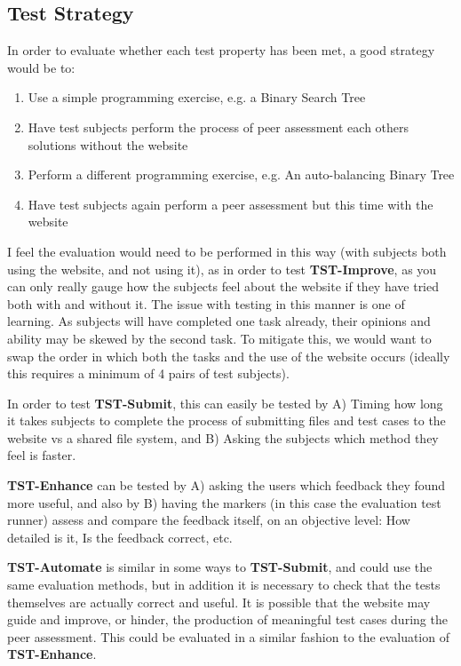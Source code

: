 \documentclass[a4paper,11pt]{report}
\begin{document}
\subsection{Test Strategy}
In order to evaluate whether each test property has been met, a good strategy would be to:
\begin{enumerate}
 \item Use a simple programming exercise, e.g. a Binary Search Tree
 \item Have test subjects perform the process of peer assessment each others solutions without the website
 \item Perform a different programming exercise, e.g. An auto-balancing Binary Tree
 \item Have test subjects again perform a peer assessment but this time with the website
\end{enumerate}
I feel the evaluation would need to be performed in this way (with subjects both using the website, and not using it), as in order to test \textbf{TST-Improve}, as you can only really gauge how the subjects feel about the website if they have tried both with and without it. The issue with testing in this manner is one of learning. As subjects will have completed one task already, their opinions and ability may be skewed by the second task. To mitigate this, we would want to swap the order in which both the tasks and the use of the website occurs (ideally this requires a minimum of 4 pairs of test subjects).\par
In order to test \textbf{TST-Submit}, this can easily be tested by A) Timing how long it takes subjects to complete the process of submitting files and test cases to the website vs a shared file system, and B) Asking the subjects which method they feel is faster.\par
\textbf{TST-Enhance} can be tested by A) asking the users which feedback they found more useful, and also by B) having the markers (in this case the evaluation test runner) assess and compare the feedback itself, on an objective level: How detailed is it, Is the feedback correct, etc.\par
\textbf{TST-Automate} is similar in some ways to \textbf{TST-Submit}, and could use the same evaluation methods, but in addition it is necessary to check that the tests themselves are actually correct and useful. It is possible that the website may guide and improve, or hinder, the production of meaningful test cases during the peer assessment. This could be evaluated in a similar fashion to the evaluation of \textbf{TST-Enhance}.
\end{document}
